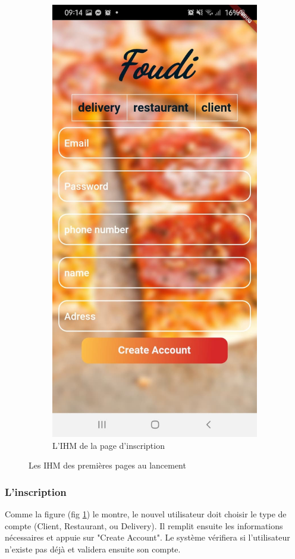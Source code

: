 \documentclass[french, a4paper, 12pt]{report}
\begin{document}
\begin{figure}[h!]
\begin{subfigure}{.5\textwidth}
  \centering
  \includegraphics[width=.9\linewidth]{screenshots/signup.jpg}
  \caption{L'IHM de la page d'inscription}
  \label{fig:signup}
\end{subfigure}
\caption{Les IHM des premières pages au lancement}
\label{fig:lanc}
\end{figure}
		
		\subsubsection{L'inscription} Comme la figure (fig \ref{fig:signup}) le montre, le nouvel utilisateur doit choisir le type de compte (Client, Restaurant, ou Delivery). Il remplit ensuite les informations nécessaires et appuie sur "Create Account".
Le système vérifiera si l'utilisateur n'existe pas déjà et validera ensuite son compte.	
\end{document}
